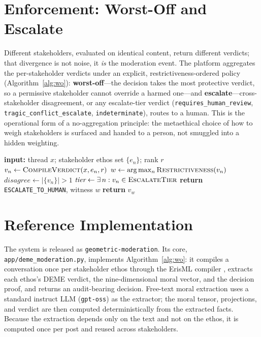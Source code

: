 \documentclass[journal]{IEEEtran}
\begin{document}
\section{Enforcement: Worst-Off and Escalate}
\label{sec:enforce}
Different stakeholders, evaluated on identical content, return different
verdicts; that divergence is not noise, it \emph{is} the moderation event. The
platform aggregates the per-stakeholder verdicts under an explicit,
restrictiveness-ordered policy (Algorithm~\ref{alg:wo}): \textbf{worst-off}---the
decision takes the most protective verdict, so a permissive stakeholder cannot
override a harmed one---and \textbf{escalate}---cross-stakeholder disagreement,
or any escalate-tier verdict (\texttt{requires\_human\_review},
\texttt{tragic\_conflict\_escalate}, \texttt{indeterminate}), routes to a human.
This is the operational form of a no-aggregation principle: the metaethical
choice of how to weigh stakeholders is surfaced and handed to a person, not
smuggled into a hidden weighting.

\begin{algorithm}[!t]
\caption{Worst-off $+$ escalate aggregation}
\label{alg:wo}
\begin{algorithmic}
\STATE \textbf{input:} thread $x$; stakeholder ethos set $\{e_n\}$; rank $r$
  \STATE $v_n \gets \textsc{CompileVerdict}(x, e_n, r)$ 
\ENDFOR
\STATE $w \gets \arg\max_n \textsc{Restrictiveness}(v_n)$ 
\STATE $\textit{disagree} \gets |\{v_n\}| > 1$
\STATE $\textit{tier} \gets \exists\,n: v_n \in \textsc{EscalateTier}$
  \STATE \textbf{return} \texttt{ESCALATE\_TO\_HUMAN}, witness $w$
\ELSE
  \STATE \textbf{return} $v_w$ 
\ENDIF
\end{algorithmic}
\end{algorithm}

\section{Reference Implementation}
\label{sec:impl}
The system is released as \texttt{geometric-moderation}. Its core,
\texttt{app/deme\_moderation.py}, implements Algorithm~\ref{alg:wo}: it compiles
a conversation once per stakeholder ethos through the ErisML compiler
\cite{erisml}, extracts each ethos's DEME verdict, the nine-dimensional moral
vector, and the decision proof, and returns an audit-bearing decision. Free-text
moral extraction uses a standard instruct LLM (\texttt{gpt-oss}) as the
extractor; the moral tensor, projections, and verdict are then computed
deterministically from the extracted facts. Because the extraction depends only
on the text and not on the ethos, it is computed once per post and reused across
stakeholders.
\end{document}
